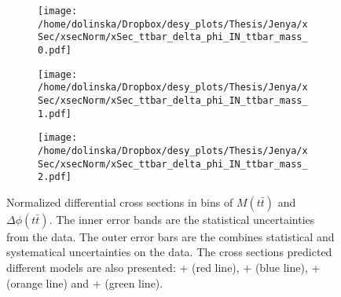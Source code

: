 \begin{figure}[p]
\centering
\begin{subfigure}
  \centering
  \texttt{[image: /home/dolinska/Dropbox/desy\_plots/Thesis/Jenya/xSec/xsecNorm/xSec\_ttbar\_delta\_phi\_IN\_ttbar\_mass\_0.pdf]}
\end{subfigure}
\begin{subfigure}
  \centering
  \texttt{[image: /home/dolinska/Dropbox/desy\_plots/Thesis/Jenya/xSec/xsecNorm/xSec\_ttbar\_delta\_phi\_IN\_ttbar\_mass\_1.pdf]}
\end{subfigure}
\begin{subfigure}
  \centering
  \texttt{[image: /home/dolinska/Dropbox/desy\_plots/Thesis/Jenya/xSec/xsecNorm/xSec\_ttbar\_delta\_phi\_IN\_ttbar\_mass\_2.pdf]}
\end{subfigure}
\caption{Normalized differential cross sections in bins of $M(t\bar{t})$ and $\Delta\phi(t\bar{t})$. The inner error bands are the statistical uncertainties from the data.
         The outer error bars are the combines statistical and systematical uncertainties on the data. The cross sections predicted different models are also presented:
         \MG + \PYTHIA (red line), \Powheg + \PYTHIA (blue line), \Powheg + \HERWIG (orange line) and \MCNLO + \HERWIG (green line).}
\label{fig:XS_2D_phi_Mtt}
\end{figure}

